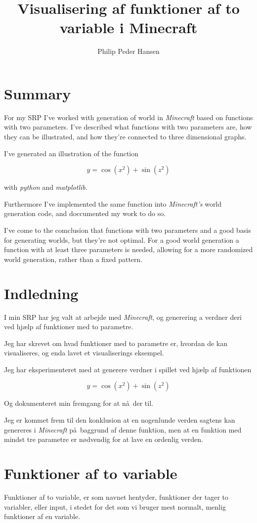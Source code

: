 \documentclass[a4paper,12pt]{report}
\author{Philip Peder Hansen}
\title{Visualisering af funktioner af to variable i Minecraft}
\begin{document}
	\maketitle
	\tableofcontents
	\clearpage
	\chapter{Summary}
		For my SRP I've worked with generation of world in \emph{Minecraft} based on functions with
		two parameters. I've described what functions with two parameters are, how they can be illustrated,
		and how they're connected to three dimensional graphs.

		I've generated an illustration of the function

		\[y = \cos (x^2) + \sin (z^2)\]

		with \emph{python} and \emph{matplotlib}.

		Furthermore I've implemented the same function into \emph{Minecraft's} world generation code,
		and doccumented my work to do so.

		I've come to the comclusion that functions with two parameters and a good basis for generating worlds,
		but they're not optimal. For a good world generation a function with at least three parameters is needed,
		allowing for a more randomized world generation, rather than a fixed pattern.
	\chapter{Indledning}
		I min SRP har jeg valt at arbejde med \emph{Minecraft}, og generering a verdner
		deri ved hj\ae lp af funktioner med to parametre.

		Jeg har skrevet om hvad funktioner med to parametre er, hvordan de kan visualiseres, og enda
		lavet et visualiserings eksempel.

		Jeg har eksperimenteret med at generere verdner i spillet ved hj\ae lp af funktionen

		\[y = \cos (x^2) + \sin (z^2)\]

		Og dokumenteret min fremgang for at n\aa \ der til.

		Jeg er kommet frem til den konklusion at en nogenlunde verden sagtens kan genereres i \emph{Minecraft}
		p\aa \ baggrund af denne funktion, men at en funktion med mindst tre parametre er n\o dvendig for at lave
		en ordenlig verden.
	\chapter{Funktioner af to variable}
		Funktioner af to variable, er som navnet hentyder, funktioner der tager to variabler, eller input,
		i stedet for det som vi bruger mest normalt, menlig funktioner af en variable.
\end{document}
